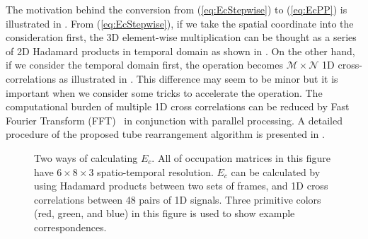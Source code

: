 \documentclass[11pt]{hyu_thesis}
\begin{document}
The motivation behind the conversion from (\ref{eq:EcStepwise}) to (\ref{eq:EcPP}) is illustrated in . From (\ref{eq:EcStepwise}), if we take the spatial coordinate into the consideration first, the 3D element-wise multiplication can be thought as a series of 2D Hadamard products in temporal domain as shown in . On the other hand, if we consider the temporal domain first, the operation becomes $\mathcal{M} \times \mathcal{N}$ 1D cross-correlations as illustrated in . This difference may seem to be minor but it is important when we consider some tricks to accelerate the operation. The computational burden of multiple 1D cross correlations can be reduced by Fast Fourier Transform (FFT)~\cite{Oppenheim2009} in conjunction with parallel processing. A detailed procedure of the proposed tube rearrangement algorithm is presented in .
\begin{figure}
	\centering
	\qquad
	\caption{Two ways of calculating $E_c$. All of occupation matrices in this figure have $6 \times 8 \times 3$ spatio-temporal resolution. $E_c$ can be calculated by using \protect{} Hadamard products between two sets of frames, and \protect{} 1D cross correlations between 48 pairs of 1D signals. Three primitive colors (red, green, and blue) in this figure is used to show example correspondences.}
	\label{fig:Ec_motivation}
\end{figure}
\end{document}
